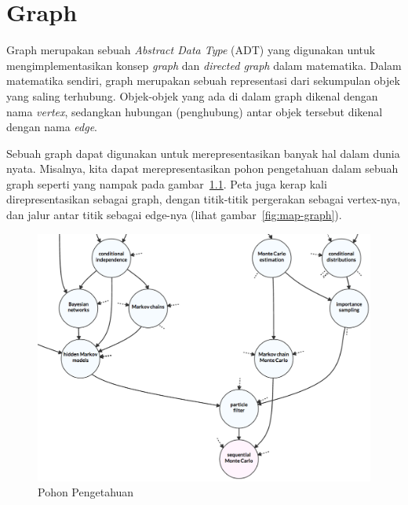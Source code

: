 \chapter{Graph}

Graph merupakan sebuah \textit{Abstract Data Type} (ADT) yang digunakan untuk mengimplementasikan konsep \textit{graph} dan \textit{directed graph} dalam matematika. Dalam matematika sendiri, graph merupakan sebuah representasi dari sekumpulan objek yang saling terhubung. Objek-objek yang ada di dalam graph dikenal dengan nama \textit{vertex}, sedangkan hubungan (penghubung) antar objek tersebut dikenal dengan nama \textit{edge}.

Sebuah graph dapat digunakan untuk merepresentasikan banyak hal dalam dunia nyata. Misalnya, kita dapat merepresentasikan pohon pengetahuan dalam sebuah graph seperti yang nampak pada gambar~\ref{fig:knowledge-tree}. Peta juga kerap kali direpresentasikan sebagai graph, dengan titik-titik pergerakan sebagai vertex-nya, dan jalur antar titik sebagai edge-nya (lihat gambar~\ref{fig:map-graph}).

\begin{figure}
    \includegraphics[width=\textwidth,keepaspectratio]{fig/KnowledgeTree.png}%
	\caption{Pohon Pengetahuan}%
	\label{fig:knowledge-tree}%
\end{figure}

